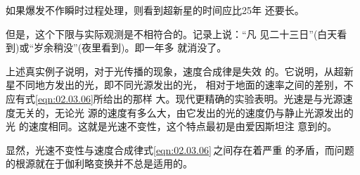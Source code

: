 如果爆发不作瞬时过程处理，则看到超新星的时间应比25年
还要长。

但是，这个下限与实际观测是不相符合的。记录上说：“凡
见二十三日”(白天看到)或“岁余稍没”(夜里看到)。即一年多
就消没了。

上述真实例子说明，对于光传播的现象，速度合成律是失效
的。它说明，从超新星不同地方发出的光，即不同光源发出的光，
相对于地面的速率之间的差别，不应有式\eqref{eqn:02.03.06}所给出的那样
大。现代更精确的实验表明。光速是与光源速度无关的，无论光
源的速度有多么大，由它发出的光的速度仍与静止光源发出的光
的速度相同。这就是光速不变性，这个特点最初是由爱因斯坦注
意到的。

显然，光速不变性与速度合成律\lbr 式\eqref{eqn:02.03.06}\,\rbr 之间存在着严重
的矛盾，而问题的根源就在于伽利略变换并不总是适用的。
